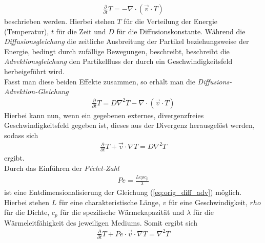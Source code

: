 \documentclass[12pt,a4paper,titlepage,headinclude,bibtotoc]{scrartcl}
\begin{document}
\begin{align}
\label{eq:adv}
\frac{\partial}{\partial t}T = - \nabla \cdot (\vec{v}\cdot T)
\end{align}
beschrieben werden. Hierbei stehen $T$ für die Verteilung der Energie (Temperatur), $t$ für die Zeit und $D$ für die Diffusionskonstante.
Während die \textit{Diffusionsgleichung} die zeitliche Ausbreitung der Partikel beziehungsweise der Energie, bedingt durch zufällige Bewegungen, beschreibt, beschreibt die \textit{Advektionsgleichung} den Partikelfluss der durch ein Geschwindigkeitsfeld herbeigeführt wird.\\
Fasst man diese beiden Effekte zusammen, so erhält man die \textit{Diffusions-Advektion-Gleichung}
\begin{align}
\frac{\partial}{\partial t}T = D \nabla^2 T - \nabla \cdot (\vec{v}\cdot T)
\end{align}
Hierbei kann nun, wenn ein gegebenen externes, divergenzfreies Geschwindigkeitsfeld gegeben ist, dieses aus der Divergenz herausgelöst werden, sodass sich
\begin{align}
\label{eq:orig_diff_adv}
\frac{\partial}{\partial t} T + \vec{v} \cdot \nabla T = D \nabla^2 T
\end{align}
ergibt.\\
Durch das Einführen der \textit{Péclet-Zahl}
\begin{align*}
Pe = \frac{L v \rho c_p}{\lambda}
\end{align*}
ist eine Entdimensionalisierung der Gleichung (\ref{eq:orig_diff_adv}) möglich. Hierbei stehen $L$ für eine charakteristische Länge, $v$ für eine Geschwindigkeit, $rho$ für die Dichte, $c_p$ für die spezifische Wärmekapazität und $\lambda$ für die Wärmeleitfähigkeit des jeweiligen Mediums. Somit ergibt sich
\begin{align}
\label{eq:diff_adv}
\frac{\partial}{\partial t} T + Pe \cdot \vec{v} \cdot \nabla T = \nabla^2 T
\end{align}
\end{document}
